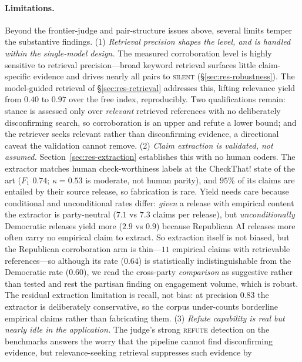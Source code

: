 \paragraph{Limitations.} Beyond the frontier-judge and pair-structure issues above, several limits
temper the substantive findings. (1) \emph{Retrieval precision shapes the level, and is handled within
the single-model design.} The measured corroboration level is highly sensitive to retrieval
precision---broad keyword retrieval surfaces little claim-specific evidence and drives nearly all pairs to
\textsc{silent} (\S\ref{sec:res-robustness}). The model-guided retrieval of \S\ref{sec:res-retrieval}
addresses this, lifting relevance yield from $0.40$ to $0.97$ over the free index, reproducibly. Two
qualifications remain: stance is assessed only over \emph{relevant} retrieved references with no
deliberately disconfirming search, so corroboration is an upper and refute a lower bound; and the retriever
seeks relevant rather than disconfirming evidence, a directional caveat the validation cannot remove. (2)
\emph{Claim extraction is validated, not assumed.} Section~\ref{sec:res-extraction} establishes this with
no human coders. The extractor
matches human check-worthiness labels at the CheckThat! state of the art ($F_1$ $0.74$; $\kappa=0.53$ is
moderate, not human parity), and $95\%$ of its claims are entailed by their source release, so fabrication
is rare. Yield needs care because conditional and unconditional rates differ: \emph{given} a release with
empirical content the extractor is party-neutral ($7.1$ vs $7.3$ claims per release), but
\emph{unconditionally} Democratic releases yield more ($2.9$ vs $0.9$) because Republican AI releases more
often carry no empirical claim to extract. So extraction itself is not biased, but the Republican
corroboration arm is thin---$11$ empirical claims with retrievable references---so although its rate
($0.64$) is statistically indistinguishable from the Democratic rate ($0.60$), we read the cross-party
\emph{comparison} as suggestive rather than tested and rest the partisan finding on engagement volume,
which is robust. The residual extraction limitation is recall, not bias: at precision $0.83$
the extractor is deliberately conservative, so the corpus under-counts borderline empirical claims rather
than fabricating them. (3) \emph{Refute capability is real but nearly idle in the
application.} The judge's strong \textsc{refute} detection on the benchmarks answers the worry that the
pipeline cannot find disconfirming evidence, but relevance-seeking retrieval suppresses such evidence by
